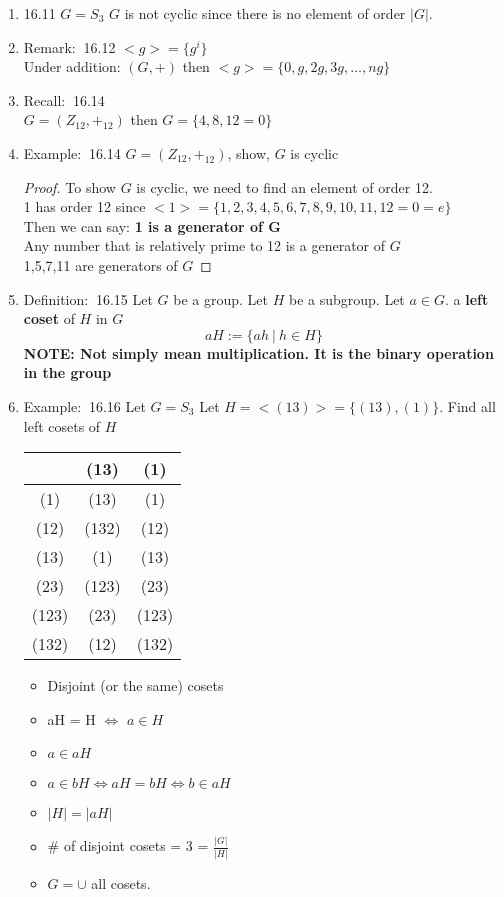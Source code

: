 \documentclass[12pt]{article}
\newcommand{\defi}{{\color{blue} Definition: $\ $}}
\newcommand{\recall}{{\color{blue} Recall: $\ $}}
\newcommand{\exe}{{\color{green} Example: $\ $}}
\newcommand{\rem}{{\color{blue} Remark: $\ $}}
\begin{document}
\begin{enumerate}
\begin{enumerate}
\begin{proof}
        \end{proof}
        \item 16.11 $G=S_3$ $G$ is not cyclic since there is no element of order $|G|$.
        \item \rem 16.12 $<g> = \{g^i\}$\\
        Under addition: $(G,+)$ then $<g> = \{0,g,2g,3g,\dots, ng\}$
        \item \recall 16.14\\
        $G = (Z_12, +_12)$ then $G = \{4,8,12 = 0\}$
        \item \exe 16.14 $G = (Z_12, +_12)$, show, $G$ is cyclic
        \begin{proof}
            To show $G$ is cyclic, we need to find an element of order 12.\\
            1 has order 12 since $<1> = \{1,2,3,4,5,6,7,8,9,10,11,12 = 0 = e\}$\\
            Then we can say: \textbf{1 is a generator of G}\\
            Any number that is relatively prime to 12 is a generator of $G$\\
            1,5,7,11 are generators of $G$
        \end{proof}
        \item \defi 16.15 Let $G$ be a group. Let $H$ be a subgroup. Let $a \in G$. a \textbf{left coset} of $H$ in $G$
        $$aH := \{ah \ | \ h \in H\}$$
        \textbf{NOTE: Not simply mean multiplication. It is the binary operation in the group}
        \item \exe 16.16 Let $G = S_3$ Let $H = <(13)> = \{(13), (1)\}$. Find all left cosets of $H$\\
        \begin{tabular}{c|cc}
            & (13) & (1)\\ \hline
            (1) & (13) & (1)\\
            (12) & (132) & (12)\\
            (13) & (1) & (13)\\
            (23) & (123) & (23)\\
            (123) & (23) & (123)\\
            (132) & (12) & (132)\\
        \end{tabular}
        \begin{itemize}
            \item Disjoint (or the same) cosets
            \item aH = H $\Leftrightarrow$ $a \in H$
            \item $a \in aH$
            \item $a \in bH \Leftrightarrow aH = bH \Leftrightarrow b \in aH$
            \item $|H| = |aH|$
            \item \# of disjoint cosets = 3 = $\frac{|G|}{|H|}$
            \item $G = \cup $ all cosets.
        \end{itemize}
    \end{enumerate}


\end{enumerate}
\end{document}
